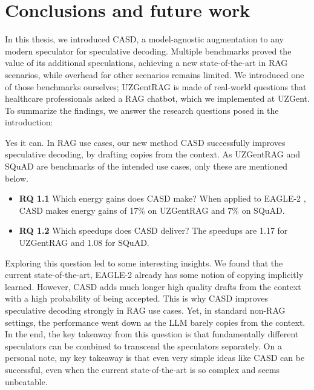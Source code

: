 
\chapter{Conclusions and future work}
\label{sec:conclusion_future_work}

In this thesis, we introduced CASD, a model-agnostic augmentation to any modern speculator for speculative decoding. Multiple benchmarks proved the value of its additional speculations, achieving a new state-of-the-art in RAG scenarios, while overhead for other scenarios remains limited. We introduced one of those benchmarks ourselves; UZGentRAG is made of real-world questions that healthcare professionals asked a RAG chatbot, which we implemented at UZGent. To summarize the findings, we answer the research questions posed in the introduction:

\begin{tcolorbox}[colback=blue-ish-light,colframe=blue-ish,title=\textbf{RQ1:} {{Can a new speculative decoding strategy be designed, relying on the repetition of phrases in prompt and answer, resulting in increased inference efficiency of LLMs?}}, coltitle=white]
    Yes it can. In RAG use cases, our new method CASD successfully improves speculative decoding, by drafting copies from the context. As UZGentRAG and SQuAD \cite{rajpurkar2016squad} are benchmarks of the intended use cases, only these are mentioned below.
    \begin{itemize}
        \item \textbf{RQ 1.1} Which energy gains does CASD make? When applied to EAGLE-2 \cite{li2024eagle}, CASD makes energy gains of 17\% on UZGentRAG and 7\% on SQuAD.
        \item \textbf{RQ 1.2} Which speedups does CASD deliver? The speedups are 1.17 for UZGentRAG and 1.08 for SQuAD.
    \end{itemize}
\end{tcolorbox}

Exploring this question led to some interesting insights. We found that the current state-of-the-art, EAGLE-2 already has some notion of copying implicitly learned. However, CASD adds much longer high quality drafts from the context with a high probability of being accepted. This is why CASD improves speculative decoding strongly in RAG use cases. Yet, in standard non-RAG settings, the performance went down as the LLM barely copies from the context. In the end, the key takeaway from this question is that fundamentally different speculators can be combined to transcend the speculators separately. On a personal note, my key takeaway is that even very simple ideas like CASD can be successful, even when the current state-of-the-art is so complex and seems unbeatable. 

